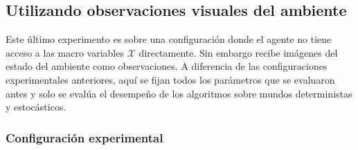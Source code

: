   
\subsection{Utilizando observaciones visuales del ambiente}

Este último experimento es sobre una configuración donde el agente 
no tiene acceso a las macro variables $\mathcal{X}$ directamente. Sin embargo recibe imágenes del estado del ambiente como observaciones. A diferencia de las
configuraciones experimentales anteriores, aquí se fijan todos los parámetros que se evaluaron antes y solo se evalúa el desempeño de los algoritmos sobre mundos deterministas y estocásticos. 

\subsubsection{Configuración experimental}

